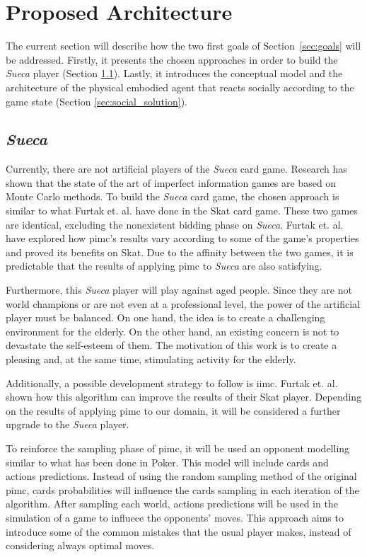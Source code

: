 \section{Proposed Architecture} \label{architecture}

The current section will describe how the two first goals of
Section~\ref{sec:goals} will be addressed.
Firstly, it presents the chosen approaches in order to build the \emph{Sueca} player (Section \ref{sec:sueca_solution}).
Lastly, it introduces the conceptual model and the architecture of the physical embodied agent that reacts socially according to the game state (Section \ref{sec:social_solution}).


\subsection{\emph{Sueca}}
\label{sec:sueca_solution}

Currently, there are not artificial players of the \emph{Sueca} card game.
Research has shown that the state of the art of imperfect information games are based on Monte Carlo methods.
To build the \emph{Sueca} card game, the chosen approach is similar to what Furtak et. al. have done in the Skat card game.
These two games are identical, excluding the nonexistent bidding phase on \emph{Sueca}.
Furtak et. al. have explored how \gls{pimc}'s results vary according to some of the game's properties and proved its benefits on Skat.
Due to the affinity between the two games, it is predictable that the results of applying \gls{pimc} to \emph{Sueca} are also satisfying.

Furthermore, this \emph{Sueca} player will play against aged people.
Since they are not world champions or are not even at a professional level, the power of the artificial player must be balanced.
On one hand, the idea is to create a challenging environment for the elderly.
On the other hand, an existing concern is not to devastate the self-esteem of them.
The motivation of this work is to create a pleasing and, at the same time, stimulating activity for the elderly.

Additionally, a possible development strategy to follow is \gls{iimc}.
Furtak et. al. shown how this algorithm can improve the results of their Skat player.
Depending on the results of applying \gls{pimc} to our domain, it will be considered a further upgrade to the \emph{Sueca} player.

To reinforce the sampling phase of \gls{pimc}, it will be used an opponent modelling similar to what has been done in Poker.
This model will include cards and actions predictions.
Instead of using the random sampling method of the original \gls{pimc}, cards probabilities will influence the cards sampling in each iteration of the algorithm.
After sampling each world, actions predictions will be used in the simulation of a game to influece the opponents' moves.
This approach aims to introduce some of the common mistakes that the usual player makes, instead of considering always optimal moves.


